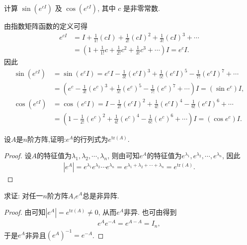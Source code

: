 \documentclass[../../main.tex]{subfiles}%
\begin{document}
\begin{example}
计算 $\sin(e^{cI})$ 及 $\cos(e^{cI})$, 其中 $c$ 是非零常数.
\end{example}
\begin{solution}

由指数矩阵函数的定义可得
\begin{align*}
e^{cI}&=I+\frac{1}{1!}(cI)+\frac{1}{2!}(cI)^2+\frac{1}{3!}(cI)^3+\cdots\\
&=\left( 1+\frac{1}{1!}c+\frac{1}{2!}c^2+\frac{1}{3!}c^3+\cdots \right) I = e^cI.
\end{align*}
因此
\begin{align*}
\sin(e^{cI})&=\sin(e^cI)=e^cI-\frac{1}{3!}(e^cI)^3+\frac{1}{5!}(e^cI)^5-\frac{1}{7!}(e^cI)^7+\cdots\\
&=\left( e^c-\frac{1}{3!}(e^c)^3+\frac{1}{5!}(e^c)^5-\frac{1}{7!}(e^c)^7+\cdots \right) I = (\sin e^c)I,\\
\cos(e^{cI})&=\cos(e^cI)=I-\frac{1}{2!}(e^cI)^2+\frac{1}{4!}(e^cI)^4-\frac{1}{6!}(e^cI)^6+\cdots\\
&=\left( 1-\frac{1}{2!}(e^c)^2+\frac{1}{4!}(e^c)^4-\frac{1}{6!}(e^c)^6+\cdots \right) I = (\cos e^c)I. 
\end{align*} 

\end{solution}

\begin{proposition}\label{proposition:矩阵函数e^A的行列式}
设$A$是$n$阶方阵,证明:$e^A$的行列式为$e^{\mathrm{tr}(A)}$.
\end{proposition}
\begin{proof}

设$A$的特征值为$\lambda_1,\lambda_2,\cdots,\lambda_n$, 则由可知$e^A$的特征值为$e^{\lambda_1},e^{\lambda_2},\cdots,e^{\lambda_n}$, 因此
\begin{align*}
|e^A| = e^{\lambda_1}e^{\lambda_2}\cdots e^{\lambda_n}=e^{\lambda_1 + \lambda_2 + \cdots + \lambda_n}=e^{\mathrm{tr}(A)}.
\end{align*} 

\end{proof}

\begin{corollary}
求证: 对任一$n$阶方阵$A$,$e^A$总是非异阵.
\end{corollary}
\begin{proof}

由可知$|e^A| = e^{\mathrm{tr}(A)}\neq 0$, 从而$e^A$非异. 也可由得到
\begin{align*}
e^Ae^{-A}=e^{A - A}=I_n,
\end{align*}
于是$e^A$非异且$(e^A)^{-1}=e^{-A}$. 

\end{proof}
\end{document}

